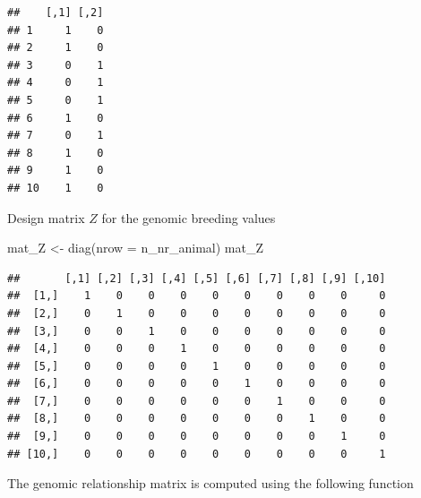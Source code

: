 \documentclass[
]{article}
\newenvironment{Shaded}{\begin{snugshade}}{\end{snugshade}}
\newcommand{\AttributeTok}[1]{\textcolor[rgb]{0.77,0.63,0.00}{#1}}
\newcommand{\FunctionTok}[1]{\textcolor[rgb]{0.00,0.00,0.00}{#1}}
\newcommand{\NormalTok}[1]{#1}
\newcommand{\OtherTok}[1]{\textcolor[rgb]{0.56,0.35,0.01}{#1}}
\begin{document}
\begin{verbatim}
##    [,1] [,2]
## 1     1    0
## 2     1    0
## 3     0    1
## 4     0    1
## 5     0    1
## 6     1    0
## 7     0    1
## 8     1    0
## 9     1    0
## 10    1    0
\end{verbatim}

Design matrix \(Z\) for the genomic breeding values

\begin{Shaded}
\begin{Highlighting}[]
\NormalTok{mat\_Z }\OtherTok{\textless{}{-}} \FunctionTok{diag}\NormalTok{(}\AttributeTok{nrow =}\NormalTok{ n\_nr\_animal)}
\NormalTok{mat\_Z}
\end{Highlighting}
\end{Shaded}

\begin{verbatim}
##       [,1] [,2] [,3] [,4] [,5] [,6] [,7] [,8] [,9] [,10]
##  [1,]    1    0    0    0    0    0    0    0    0     0
##  [2,]    0    1    0    0    0    0    0    0    0     0
##  [3,]    0    0    1    0    0    0    0    0    0     0
##  [4,]    0    0    0    1    0    0    0    0    0     0
##  [5,]    0    0    0    0    1    0    0    0    0     0
##  [6,]    0    0    0    0    0    1    0    0    0     0
##  [7,]    0    0    0    0    0    0    1    0    0     0
##  [8,]    0    0    0    0    0    0    0    1    0     0
##  [9,]    0    0    0    0    0    0    0    0    1     0
## [10,]    0    0    0    0    0    0    0    0    0     1
\end{verbatim}

The genomic relationship matrix is computed using the following function
\end{document}
